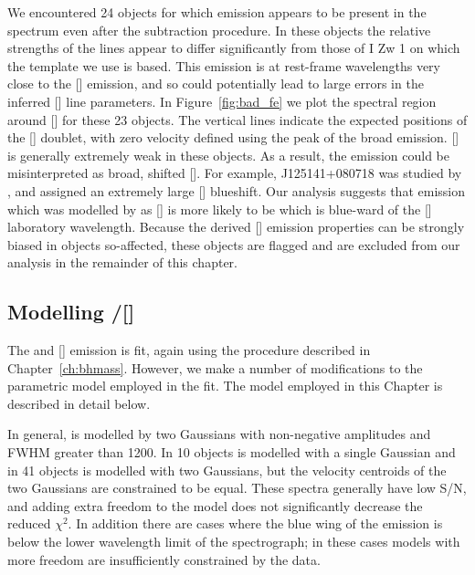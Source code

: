 We encountered 24 objects for which  emission appears to be present in the spectrum even after the subtraction procedure. 
In these objects the relative strengths of the  lines appear to differ significantly from those of I Zw 1 on which the  template we use is based. 
This emission is at rest-frame wavelengths very close to the [] emission, and so could potentially lead to large errors in the inferred [] line parameters. 
In Figure~\ref{fig:bad_fe} we plot the spectral region around [] for these 23 objects.
The vertical lines indicate the expected positions of the [] doublet, with zero velocity defined using the peak of the broad \hb emission. 
[] is generally extremely weak in these objects. 
As a result, the  emission could be misinterpreted as broad, shifted []. 
For example, J125141+080718 was studied by \citet{shen16a}, and assigned an extremely large [] blueshift. 
Our analysis suggests that emission which was modelled by \citet{shen16a} as [] is more likely to be  which is blue-ward of the [] laboratory wavelength. 
Because the derived [] emission properties can be strongly biased in objects so-affected, these objects are flagged and are excluded from our analysis in the remainder of this chapter. 

\subsection{Modelling \hbns/[]}

The \hb and [] emission is fit, again using the procedure described in Chapter~\ref{ch:bhmass}. 
However, we make a number of modifications to the parametric model employed in the fit.
The model employed in this Chapter is described in detail below.  

In general, \hb is modelled by two Gaussians with non-negative amplitudes and FWHM greater than 1200\kms.
In 10 objects \hb is modelled with a single Gaussian and in 41 objects \hb is modelled with two Gaussians, but the velocity centroids of the two Gaussians are constrained to be equal. 
These spectra generally have low S/N, and adding extra freedom to the model does not significantly decrease the  reduced $\chi^2$.
In addition there are cases where the blue wing of the \hb emission is below the lower wavelength limit of the spectrograph; in these cases models with more freedom are insufficiently constrained by the data.    

